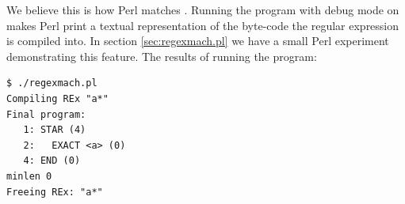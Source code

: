 We believe this is how Perl matches \cite{pelreguts}. Running the
program with debug mode on makes Perl print a textual representation
of the byte-code the regular expression is compiled into. In section
\vref{sec:regexmach.pl} we have a small Perl experiment demonstrating
this feature. The results of running the program:
\begin{verbatim}
$ ./regexmach.pl 
Compiling REx "a*"
Final program:
   1: STAR (4)
   2:   EXACT <a> (0)
   4: END (0)
minlen 0 
Freeing REx: "a*"
\end{verbatim}

